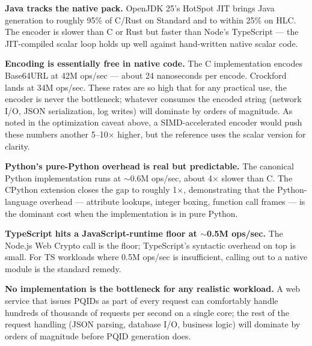 \textbf{Java tracks the native pack.} OpenJDK 25's HotSpot JIT brings Java generation to roughly 95\% of C/Rust on Standard and to within 25\% on HLC. The encoder is slower than C or Rust but faster than Node's TypeScript --- the JIT-compiled scalar loop holds up well against hand-written native scalar code.

\textbf{Encoding is essentially free in native code.} The C implementation encodes Base64URL at 42M ops/sec --- about 24 nanoseconds per encode. Crockford lands at 34M ops/sec. These rates are so high that for any practical use, the encoder is never the bottleneck; whatever consumes the encoded string (network I/O, JSON serialization, log writes) will dominate by orders of magnitude. As noted in the optimization caveat above, a SIMD-accelerated encoder would push these numbers another 5--10$\times$ higher, but the reference uses the scalar version for clarity.

\textbf{Python's pure-Python overhead is real but predictable.} The canonical Python implementation runs at $\sim$0.6M ops/sec, about 4$\times$ slower than C. The CPython extension closes the gap to roughly 1$\times$, demonstrating that the Python-language overhead --- attribute lookups, integer boxing, function call frames --- is the dominant cost when the implementation is in pure Python.

\textbf{TypeScript hits a JavaScript-runtime floor at $\sim$0.5M ops/sec.} The Node.js Web Crypto  call is the floor; TypeScript's syntactic overhead on top is small. For TS workloads where 0.5M ops/sec is insufficient, calling out to a native module is the standard remedy.

\textbf{No implementation is the bottleneck for any realistic workload.} A web service that issues PQIDs as part of every request can comfortably handle hundreds of thousands of requests per second on a single core; the rest of the request handling (JSON parsing, database I/O, business logic) will dominate by orders of magnitude before PQID generation does.

